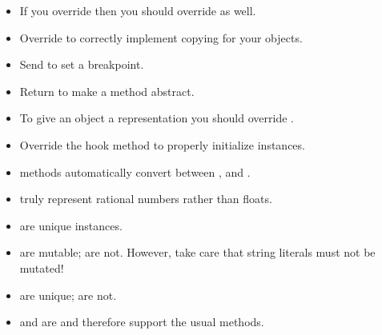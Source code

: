 \documentclass[a4paper,10pt,twoside]{book}
\begin{document}
\begin{itemize}

  \item If you override \ct{=} then you should override  as well.

  \item Override  to correctly implement copying for your objects.

  \item Send  to set a breakpoint.

  \item Return  to make a method abstract.

  \item To give an object a  representation you should override .

  \item Override the hook method  to properly initialize instances.

  \item {} methods automatically convert between ,  and .

  \item {} truly represent rational numbers rather than floats.

  \item {} are unique instances.

  \item {} are mutable;  are not.
  However, take care that string literals must not be mutated!

  \item {} are unique;  are not.

  \item {} and  are  and therefore support the usual  methods.

\end{itemize}

\ifx\wholebook\relax\else
   
   
\end{document}
